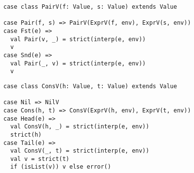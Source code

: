 \textbf{}
\vspace{-1em}
\begin{verbatim}
case class PairV(f: Value, s: Value) extends Value

case Pair(f, s) => PairV(ExprV(f, env), ExprV(s, env))
case Fst(e) =>
  val Pair(v, _) = strict(interp(e, env))
  v
case Snd(e) =>
  val Pair(_, v) = strict(interp(e, env))
  v
\end{verbatim}

\textbf{}
\vspace{-1em}
\begin{verbatim}
case class ConsV(h: Value, t: Value) extends Value

case Nil => NilV
case Cons(h, t) => ConsV(ExprV(h, env), ExprV(t, env))
case Head(e) =>
  val ConsV(h, _) = strict(interp(e, env))
  strict(h)
case Tail(e) =>
  val ConsV(_, t) = strict(interp(e, env))
  val v = strict(t)
  if (isList(v)) v else error()
\end{verbatim}
